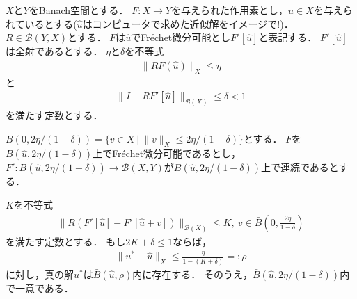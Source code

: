 \begin{Thm}[基本定理]\label{thm:Basic_Theorem}
	$X$と$Y$をBanach空間とする．
	$F:X \rightarrow Y$を与えられた作用素とし，$\hat{u} \in X$を与えられているとする($\hat{u}$はコンピュータで求めた近似解をイメージで!)．
	$R \in {\mathcal B}(Y, X)$とする．
	$F$は$\hat{u}$でFr\'echet微分可能とし$F'[\hat{u}]$と表記する．
	$F'[\hat{u}]$は全射であるとする．
	$\eta$と$\delta$を不等式
	\begin{align*}
	\| R F(\hat{u}) \|_{X} \le \eta
	\end{align*}
	と
	\begin{align*}
	\| I -  R F'[\hat{u}] \|_{{\mathcal B}(X)} \le \delta < 1
	\end{align*}
	を満たす定数とする．
	
	$\bar{B}(0, 2\eta/(1-\delta))=\{ v \in X ~|~ \| v \|_{X} \le 2\eta/(1-\delta) \}$とする．
	$F$を$\bar{B}(\hat{u}, 2\eta/(1-\delta))$上でFr\'echet微分可能であるとし，$F': \bar{B}(\hat{u}, 2\eta/(1-\delta)) \rightarrow {\mathcal B}(X, Y)$が$\bar{B}(\hat{u}, 2\eta/(1-\delta))$上で連続であるとする．

	$K$を不等式
	\begin{align*}
	\| R \left( F'[\hat{u}] -  F'[\hat{u} + v] \right) \|_{{\mathcal B}(X)} \le K, ~ v \in \bar{B}\left( 0, \frac{2\eta}{1-\delta} \right)
	\end{align*}
	を満たす定数とする．
	もし$2K+\delta \le 1$ならば，
	\begin{align*}
	\| u^* - \hat{u} \|_{X} \le \frac{ \eta }{1 - (K+\delta)} =: \rho
	\end{align*}
	に対し，真の解$u^*$は$\bar{B}(\hat{u}, \rho)$内に存在する．
	そのうえ，$\bar{B}(\hat{u}, 2\eta/(1-\delta))$内で一意である．
\end{Thm}

